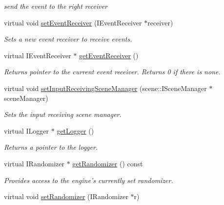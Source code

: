 \begin{DoxyCompactItemize}
\begin{DoxyCompactList}\small\item\em send the event to the right receiver \end{DoxyCompactList}\item 
\hypertarget{classirr_1_1_c_irr_device_stub_abed64fb546b237ad4456654d0d7cfcb4}{virtual void \hyperlink{classirr_1_1_c_irr_device_stub_abed64fb546b237ad4456654d0d7cfcb4}{set\-Event\-Receiver} (I\-Event\-Receiver $\ast$receiver)}\label{classirr_1_1_c_irr_device_stub_abed64fb546b237ad4456654d0d7cfcb4}

\begin{DoxyCompactList}\small\item\em Sets a new event receiver to receive events. \end{DoxyCompactList}\item 
virtual I\-Event\-Receiver $\ast$ \hyperlink{classirr_1_1_c_irr_device_stub_a3bd8cf4fb1154ad529bb434b6631705a}{get\-Event\-Receiver} ()
\begin{DoxyCompactList}\small\item\em Returns pointer to the current event receiver. Returns 0 if there is none. \end{DoxyCompactList}\item 
virtual void \hyperlink{classirr_1_1_c_irr_device_stub_ad321a2cf4e9fe99d64b33520960ac323}{set\-Input\-Receiving\-Scene\-Manager} (scene\-::\-I\-Scene\-Manager $\ast$scene\-Manager)
\begin{DoxyCompactList}\small\item\em Sets the input receiving scene manager. \end{DoxyCompactList}\item 
virtual I\-Logger $\ast$ \hyperlink{classirr_1_1_c_irr_device_stub_a81623f82b72d8e823fb4fef07ba2793b}{get\-Logger} ()
\begin{DoxyCompactList}\small\item\em Returns a pointer to the logger. \end{DoxyCompactList}\item 
\hypertarget{classirr_1_1_c_irr_device_stub_a03b549b7d410e61ff9871e756559a3a9}{virtual I\-Randomizer $\ast$ \hyperlink{classirr_1_1_c_irr_device_stub_a03b549b7d410e61ff9871e756559a3a9}{get\-Randomizer} () const }\label{classirr_1_1_c_irr_device_stub_a03b549b7d410e61ff9871e756559a3a9}

\begin{DoxyCompactList}\small\item\em Provides access to the engine's currently set randomizer. \end{DoxyCompactList}\item 
\hypertarget{classirr_1_1_c_irr_device_stub_af27bb87ba6beca89222afba412a93cc3}{virtual void \hyperlink{classirr_1_1_c_irr_device_stub_af27bb87ba6beca89222afba412a93cc3}{set\-Randomizer} (I\-Randomizer $\ast$r)}\label{classirr_1_1_c_irr_device_stub_af27bb87ba6beca89222afba412a93cc3}


\end{DoxyCompactItemize}
